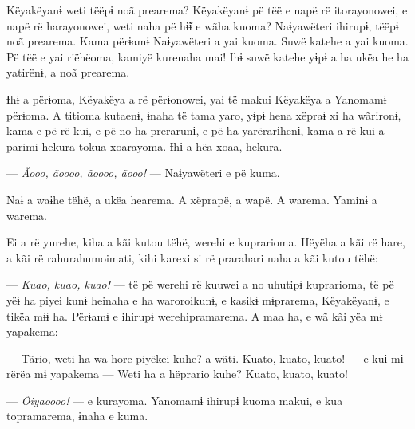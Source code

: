 Këyakëyanɨ weti tëëpɨ noã prearema? Këyakëyanɨ pë tëë e napë rë
itorayonowei, e napë rë harayonowei, weti naha pë hɨ̃ɨ e wãha kuoma?
Naɨyawëteri ihirupɨ, tëëpɨ noã prearema. Kama përɨamɨ Naɨyawëteri a yai
kuoma. Suwë katehe a yai kuoma. Pë tëë e yai riëhëoma, kamiyë kurenaha
mai! Ɨhɨ suwë katehe yɨpɨ a ha ukëa he ha yatirënɨ, a noã prearema. 

Ɨhɨ a përɨoma, Këyakëya a rë përɨonowei, yai të makui Këyakëya a
Yanomamɨ përɨoma. A titioma kutaenɨ, ɨnaha të tama yaro, yɨpɨ hena
xëpraɨ xi ha wãrironɨ, kama e pë rë kui, e pë no ha prerarunɨ, e pë ha
yarërarɨhenɨ, kama a rë kui a parimi hekura tokua xoarayoma. Ɨhɨ a hëa
xoaa, hekura. 


--- \textit{Ãooo, ãoooo, ãoooo, ãooo!} --- Naɨyawëteri e pë kuma. 

Naɨ a waɨhe tëhë, a ukëa hearema. A xëprapë, a wapë. A warema. Yaminɨ a
warema. 


Ei a rë yurehe, kiha a kãi kutou tëhë, werehi e kuprarioma. Hëyëha a kãi
rë hare, a kãi rë rahurahumoimati, kihi karexi si rë prarahari naha a
kãi kutou tëhë: 

--- \textit{Kuao, kuao, kuao!} --- të pë werehi rë kuuwei a no uhutipɨ
kuprarioma, të pë yëɨ ha piyei kunɨ heinaha e ha waroroikunɨ, e kasikɨ
mɨprarema, Këyakëyanɨ, e tikëa mɨɨ ha. Përɨamɨ e ihirupɨ
werehipramarema. A maa ha, e wã kãi yëa mɨ yapakema: 

--- Tãrio, weti ha wa hore piyëkei kuhe? a wãti. Kuato, kuato, kuato!
--- e kuɨ mɨ rërëa mɨ yapakema --- Weti ha a hëprario kuhe? Kuato,
kuato, kuato! 

--- \textit{Õiyaoooo!} --- e kurayoma. Yanomamɨ ihirupɨ kuoma makui, e kua
topramarema, ɨnaha e kuma. 


